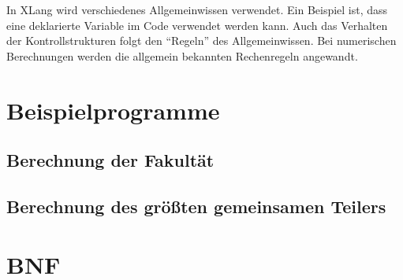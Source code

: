 \documentclass[a4paper]{article}
\begin{document}
In XLang wird verschiedenes Allgemeinwissen verwendet.
Ein Beispiel ist, dass eine deklarierte Variable im Code verwendet werden kann.
Auch das Verhalten der Kontrollstrukturen folgt den \enquote{Regeln} des Allgemeinwissen.
Bei numerischen Berechnungen werden die allgemein bekannten Rechenregeln angewandt.


\section{Beispielprogramme}

\subsection{Berechnung der Fakultät}



\subsection{Berechnung des größten gemeinsamen Teilers}



\section{BNF}


\end{document}
